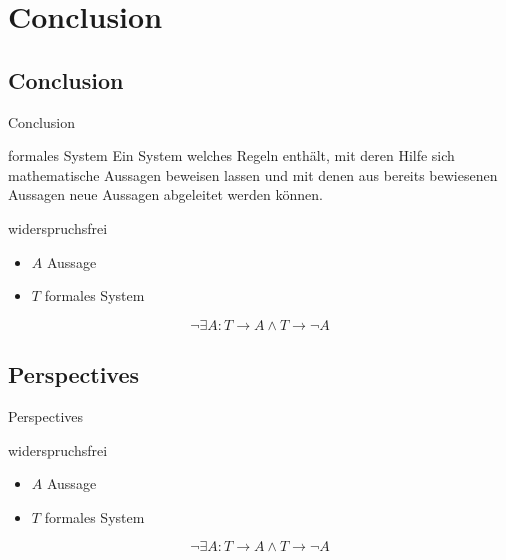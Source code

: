 \section{Conclusion}
\subsection{Conclusion}
\begin{frame}{Conclusion}
    \begin{block}{formales System}
        Ein System welches Regeln enthält, mit deren Hilfe sich mathematische Aussagen beweisen lassen und mit denen aus bereits bewiesenen Aussagen neue Aussagen abgeleitet werden können.
    \end{block}
    \begin{block}{widerspruchsfrei}
        \begin{itemize}
            \item $A$ Aussage
            \item $T$ formales System
        \end{itemize}
        $$\neg\exists A: T\rightarrow{}A \wedge T\rightarrow{}\neg{}A $$
    \end{block}
\end{frame}

\subsection{Perspectives}
\begin{frame}{Perspectives}
\begin{block}{widerspruchsfrei}
	\begin{itemize}
		\item $A$ Aussage
		\item $T$ formales System
	\end{itemize}
	$$\neg\exists A: T\rightarrow{}A \wedge T\rightarrow{}\neg{}A $$
\end{block}
\end{frame}